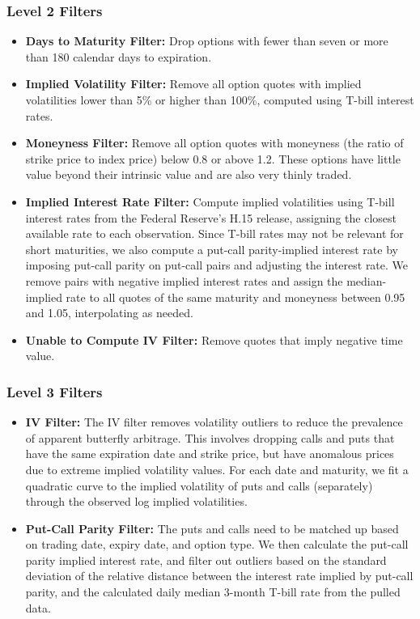 \documentclass[11pt]{article}
\begin{document}
\subsubsection{Level 2 Filters}
\begin{itemize}
  \item \textbf{Days to Maturity Filter:} Drop options with fewer than seven or more than 180 calendar days to expiration.
  \item \textbf{Implied Volatility Filter:} Remove all option quotes with implied volatilities lower than 5\% or higher than 100\%, computed using T-bill interest rates.
  \item \textbf{Moneyness Filter:} Remove all option quotes with moneyness (the ratio of strike price to index price) below 0.8 or above 1.2. These options have little value beyond their intrinsic value and are also very thinly traded.
  \item \textbf{Implied Interest Rate Filter:} Compute implied volatilities using T-bill interest rates from the Federal Reserve's H.15 release, assigning the closest available rate to each observation. Since T-bill rates may not be relevant for short maturities, we also compute a put-call parity-implied interest rate by imposing put-call parity on put-call pairs and adjusting the interest rate. We remove pairs with negative implied interest rates and assign the median-implied rate to all quotes of the same maturity and moneyness between 0.95 and 1.05, interpolating as needed.
  \item \textbf{Unable to Compute IV Filter:} Remove quotes that imply negative time value.
\end{itemize}

\subsubsection{Level 3 Filters}
\begin{itemize}
  \item \textbf{IV Filter:} The IV filter removes volatility outliers to reduce the prevalence of apparent butterfly arbitrage. This involves dropping calls and puts that have the same expiration date and strike price, but have anomalous prices due to extreme implied volatility values. For each date and maturity, we fit a quadratic curve to the implied volatility of puts and calls (separately) through the observed log implied volatilities.
  \item \textbf{Put-Call Parity Filter:} The puts and calls need to be matched up based on trading date, expiry date, and option type. We then calculate the put-call parity implied interest rate, and filter out outliers based on the standard deviation of the relative distance between the interest rate implied by put-call parity, and the calculated daily median 3-month T-bill rate from the pulled data.
\end{itemize}
\end{document}
